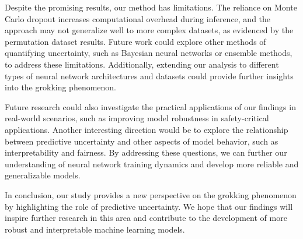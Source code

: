 \documentclass{article} %
\begin{document}
Despite the promising results, our method has limitations. The reliance on Monte Carlo dropout increases computational overhead during inference, and the approach may not generalize well to more complex datasets, as evidenced by the permutation dataset results. Future work could explore other methods of quantifying uncertainty, such as Bayesian neural networks or ensemble methods, to address these limitations. Additionally, extending our analysis to different types of neural network architectures and datasets could provide further insights into the grokking phenomenon.

Future research could also investigate the practical applications of our findings in real-world scenarios, such as improving model robustness in safety-critical applications. Another interesting direction would be to explore the relationship between predictive uncertainty and other aspects of model behavior, such as interpretability and fairness. By addressing these questions, we can further our understanding of neural network training dynamics and develop more reliable and generalizable models.

In conclusion, our study provides a new perspective on the grokking phenomenon by highlighting the role of predictive uncertainty. We hope that our findings will inspire further research in this area and contribute to the development of more robust and interpretable machine learning models.



\end{document}

